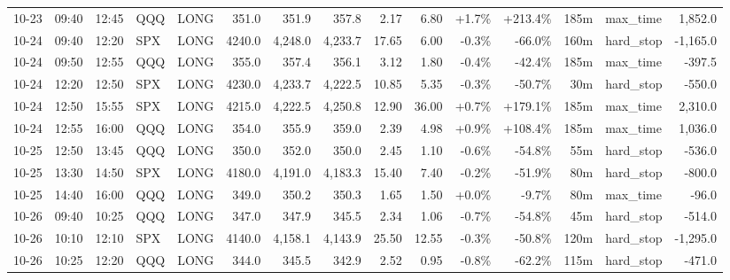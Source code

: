 \documentclass[11pt,a4paper,twoside]{article}
\begin{document}
\begin{landscape}
\begin{center}
\begin{longtable}{>{\color{txtmain}}l l l l l r r r r r r r r >{\color{txtmain}}l r}
10-23 & 09:40 & 12:45 & QQQ & LONG & 351.0 & 351.9 & 357.8 & 2.17 & 6.80 & \textcolor{wingreen}{+1.7\%} & \textcolor{wingreen}{+213.4\%} & 185m & max\_time & \textcolor{wingreen}{1,852.0} \\
10-24 & 09:40 & 12:20 & SPX & LONG & 4240.0 & 4,248.0 & 4,233.7 & 17.65 & 6.00 & \textcolor{lossred}{-0.3\%} & \textcolor{lossred}{-66.0\%} & 160m & hard\_stop & \textcolor{lossred}{-1,165.0} \\
10-24 & 09:50 & 12:55 & QQQ & LONG & 355.0 & 357.4 & 356.1 & 3.12 & 1.80 & \textcolor{lossred}{-0.4\%} & \textcolor{lossred}{-42.4\%} & 185m & max\_time & \textcolor{lossred}{-397.5} \\
10-24 & 12:20 & 12:50 & SPX & LONG & 4230.0 & 4,233.7 & 4,222.5 & 10.85 & 5.35 & \textcolor{lossred}{-0.3\%} & \textcolor{lossred}{-50.7\%} & 30m & hard\_stop & \textcolor{lossred}{-550.0} \\
10-24 & 12:50 & 15:55 & SPX & LONG & 4215.0 & 4,222.5 & 4,250.8 & 12.90 & 36.00 & \textcolor{wingreen}{+0.7\%} & \textcolor{wingreen}{+179.1\%} & 185m & max\_time & \textcolor{wingreen}{2,310.0} \\
10-24 & 12:55 & 16:00 & QQQ & LONG & 354.0 & 355.9 & 359.0 & 2.39 & 4.98 & \textcolor{wingreen}{+0.9\%} & \textcolor{wingreen}{+108.4\%} & 185m & max\_time & \textcolor{wingreen}{1,036.0} \\
10-25 & 12:50 & 13:45 & QQQ & LONG & 350.0 & 352.0 & 350.0 & 2.45 & 1.10 & \textcolor{lossred}{-0.6\%} & \textcolor{lossred}{-54.8\%} & 55m & hard\_stop & \textcolor{lossred}{-536.0} \\
10-25 & 13:30 & 14:50 & SPX & LONG & 4180.0 & 4,191.0 & 4,183.3 & 15.40 & 7.40 & \textcolor{lossred}{-0.2\%} & \textcolor{lossred}{-51.9\%} & 80m & hard\_stop & \textcolor{lossred}{-800.0} \\
10-25 & 14:40 & 16:00 & QQQ & LONG & 349.0 & 350.2 & 350.3 & 1.65 & 1.50 & \textcolor{wingreen}{+0.0\%} & \textcolor{lossred}{-9.7\%} & 80m & max\_time & \textcolor{lossred}{-96.0} \\
10-26 & 09:40 & 10:25 & QQQ & LONG & 347.0 & 347.9 & 345.5 & 2.34 & 1.06 & \textcolor{lossred}{-0.7\%} & \textcolor{lossred}{-54.8\%} & 45m & hard\_stop & \textcolor{lossred}{-514.0} \\
10-26 & 10:10 & 12:10 & SPX & LONG & 4140.0 & 4,158.1 & 4,143.9 & 25.50 & 12.55 & \textcolor{lossred}{-0.3\%} & \textcolor{lossred}{-50.8\%} & 120m & hard\_stop & \textcolor{lossred}{-1,295.0} \\
10-26 & 10:25 & 12:20 & QQQ & LONG & 344.0 & 345.5 & 342.9 & 2.52 & 0.95 & \textcolor{lossred}{-0.8\%} & \textcolor{lossred}{-62.2\%} & 115m & hard\_stop & \textcolor{lossred}{-471.0} \\

\end{longtable}
\end{center}
\end{landscape}
\end{document}
